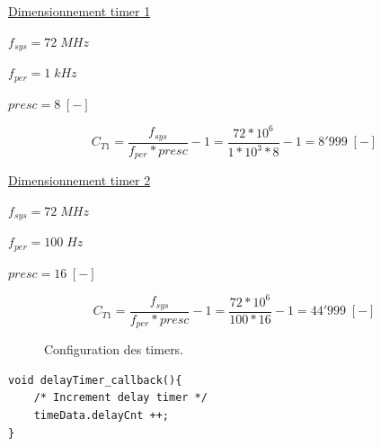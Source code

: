 \underline{Dimensionnement timer 1}

$f_{sys} = 72\;MHz$

$f_{per} = 1\;kHz$

$presc = 8\;[-]$ \vspace*{-5pt}

\begin{equation*}
	C_{T1} = \frac{f_{sys}}{f_{per}*presc} - 1 = \frac{72*10^{6}}{1*10^{3}*8} - 1 = 8'999\; [-]
\end{equation*}


\underline{Dimensionnement timer 2}

$f_{sys} = 72\;MHz$

$f_{per} = 100\;Hz$

$presc = 16\;[-]$ \vspace*{-5pt}

\begin{equation}
	C_{T1} = \frac{f_{sys}}{f_{per}*presc} - 1 = \frac{72*10^{6}}{100*16} - 1 = 44'999\; [-]
\end{equation}

\begin{figure}[h]
	\centering
	\caption{Configuration des timers.}
	\label{fig:timers}
\end{figure}

\clearpage

\begin{code}
\caption{Interruption \textbf{timer 1}, 1 [$ms$]}
\label{code:int-t1}
\begin{verbatim}
void delayTimer_callback(){
	/* Increment delay timer */
	timeData.delayCnt ++;
}
\end{verbatim}
\end{code}

